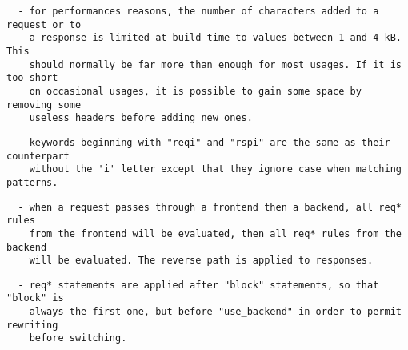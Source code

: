 \begin{verbatim}
  - for performances reasons, the number of characters added to a request or to
    a response is limited at build time to values between 1 and 4 kB. This
    should normally be far more than enough for most usages. If it is too short
    on occasional usages, it is possible to gain some space by removing some
    useless headers before adding new ones.
\end{verbatim}

\begin{verbatim}
  - keywords beginning with "reqi" and "rspi" are the same as their counterpart
    without the 'i' letter except that they ignore case when matching patterns.
\end{verbatim}

\begin{verbatim}
  - when a request passes through a frontend then a backend, all req* rules
    from the frontend will be evaluated, then all req* rules from the backend
    will be evaluated. The reverse path is applied to responses.
\end{verbatim}

\begin{verbatim}
  - req* statements are applied after "block" statements, so that "block" is
    always the first one, but before "use_backend" in order to permit rewriting
    before switching.
\end{verbatim}

